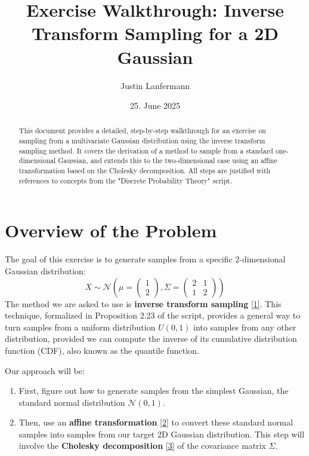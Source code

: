 \documentclass[11pt,a4paper]{article}
\title{Exercise Walkthrough: Inverse Transform Sampling for a 2D Gaussian}
\author{Justin Lanfermann}
\date{25. June 2025}
\newcommand{\N}{\mathcal{N}}
\begin{document}
\maketitle

\begin{abstract}
    This document provides a detailed, step-by-step walkthrough for an exercise on sampling from a multivariate Gaussian distribution using the inverse transform sampling method. It covers the derivation of a method to sample from a standard one-dimensional Gaussian, and extends this to the two-dimensional case using an affine transformation based on the Cholesky decomposition. All steps are justified with references to concepts from the "Discrete Probability Theory" script.
\end{abstract}

\section{Overview of the Problem}

The goal of this exercise is to generate samples from a specific 2-dimensional Gaussian distribution:
\[ X \sim \N\left(\mu = \begin{pmatrix} 1 \\ 2 \end{pmatrix}, \Sigma = \begin{pmatrix} 2 & 1 \\ 1 & 2 \end{pmatrix}\right) \]
The method we are asked to use is \textbf{inverse transform sampling} \hyperref[concept:its]{[1]}. This technique, formalized in Proposition 2.23 of the script, provides a general way to turn samples from a uniform distribution $U(0,1)$ into samples from any other distribution, provided we can compute the inverse of its cumulative distribution function (CDF), also known as the quantile function.

Our approach will be:
\begin{enumerate}
    \item First, figure out how to generate samples from the simplest Gaussian, the standard normal distribution $\N(0,1)$.
    \item Then, use an \textbf{affine transformation} \hyperref[concept:affine]{[2]} to convert these standard normal samples into samples from our target 2D Gaussian distribution. This step will involve the \textbf{Cholesky decomposition} \hyperref[concept:cholesky]{[3]} of the covariance matrix $\Sigma$.
\end{enumerate}
\end{document}
